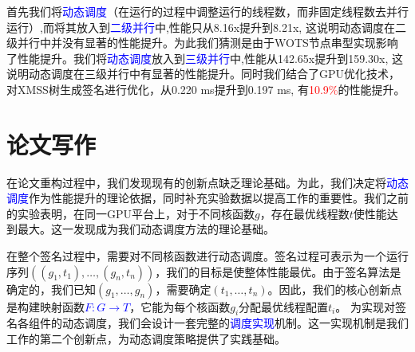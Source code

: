 \documentclass[report]{../../custom}
\begin{document}
首先我们将\textcolor{blue}{动态调度}（在运行的过程中调整运行的线程数，而非固定线程数去并行运行）,而将其放入到\textcolor{blue}{二级并行}中,性能只从8.16x提升到8.21x, 这说明动态调度在二级并行中并没有显著的性能提升。为此我们猜测是由于WOTS节点串型实现影响了性能提升。我们将\textcolor{blue}{动态调度}放入到\textcolor{blue}{三级并行}中,性能从142.65x提升到159.30x, 这说明动态调度在三级并行中有显著的性能提升。同时我们结合了GPU优化技术，对XMSS树生成签名进行优化，从0.220 ms提升到0.197 ms, 有\textcolor{red}{10.9\%}的性能提升。

\section{论文写作}

在论文重构过程中，我们发现现有的创新点缺乏理论基础。为此，我们决定将\textcolor{blue}{动态调度}作为性能提升的理论依据，同时补充实验数据以提高工作的重要性。我们之前的实验表明，在同一GPU平台上，对于不同核函数$g$，存在最优线程数$t$使性能达到最大。这一发现成为我们动态调度方法的理论基础。

在整个签名过程中，需要对不同核函数进行动态调度。签名过程可表示为一个运行序列$((g_1,t_1),\dots,(g_n,t_n))$，我们的目标是使整体性能最优。由于签名算法是确定的，我们已知$(g_1,\dots,g_n)$，需要确定$(t_1,\dots,t_n)$。因此，我们的核心创新点是构建映射函数\textcolor{blue}{$F:G\rightarrow T$}，它能为每个核函数$g_i$分配最优线程配置$t_i$。
为实现对签名各组件的动态调度，我们会设计一套完整的\textcolor{blue}{调度实现}机制。这一实现机制是我们工作的第二个创新点，为动态调度策略提供了实践基础。



\end{document}
